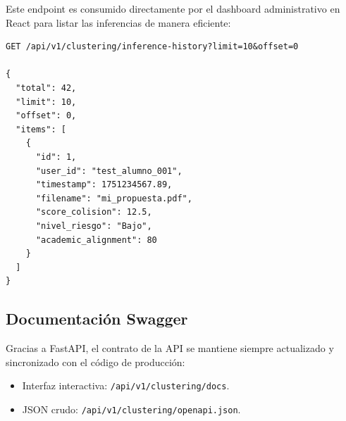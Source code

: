 Este endpoint es consumido directamente por el dashboard administrativo en React para listar las inferencias de manera eficiente:

\begin{lstlisting}[style=jsonstyle]
GET /api/v1/clustering/inference-history?limit=10&offset=0

{
  "total": 42,
  "limit": 10,
  "offset": 0,
  "items": [
    {
      "id": 1,
      "user_id": "test_alumno_001",
      "timestamp": 1751234567.89,
      "filename": "mi_propuesta.pdf",
      "score_colision": 12.5,
      "nivel_riesgo": "Bajo",
      "academic_alignment": 80
    }
  ]
}
\end{lstlisting}

\subsection{Documentación Swagger}

Gracias a FastAPI, el contrato de la API se mantiene siempre actualizado y sincronizado con el código de producción:

\begin{itemize}
  \item Interfaz interactiva: \texttt{/api/v1/clustering/docs}.
  \item JSON crudo: \texttt{/api/v1/clustering/openapi.json}.
\end{itemize}

